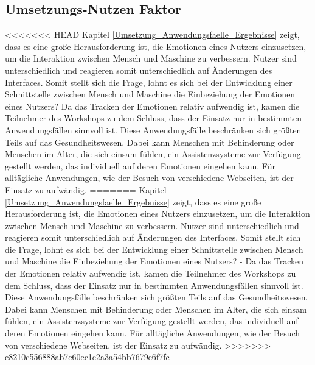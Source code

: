 \subsection{Umsetzungs-Nutzen Faktor}
<<<<<<< HEAD
Kapitel \ref{Umsetzung_Anwendungsfaelle_Ergebnisse} zeigt, dass es eine große Herausforderung ist, die Emotionen eines Nutzers einzusetzen, um die Interaktion zwischen Mensch und Maschine zu verbessern. Nutzer sind unterschiedlich und reagieren somit unterschiedlich auf Änderungen des Interfaces. Somit stellt sich die Frage, lohnt es sich bei der Entwicklung einer Schnittstelle zwischen Mensch und Maschine die Einbeziehung der Emotionen eines Nutzers? Da das Tracken der Emotionen relativ aufwendig ist, kamen die Teilnehmer des Workshops zu dem Schluss, dass der Einsatz nur in bestimmten Anwendungsfällen sinnvoll ist. Diese Anwendungsfälle beschränken sich größten Teils auf das Gesundheitswesen. Dabei kann Menschen mit Behinderung oder Menschen im Alter, die sich einsam fühlen, ein Assistenzsysteme zur Verfügung gestellt werden, das individuell auf deren Emotionen eingehen kann. Für alltägliche Anwendungen, wie der Besuch von verschiedene Webseiten, ist der Einsatz zu aufwändig.
=======
Kapitel \ref{Umsetzung_Anwendungsfaelle_Ergebnisse} zeigt, dass es eine große Herausforderung ist, die Emotionen eines Nutzers einzusetzen, um die Interaktion zwischen Mensch und Maschine zu verbessern. Nutzer sind unterschiedlich und reagieren somit unterschiedlich auf Änderungen des Interfaces. Somit stellt sich die Frage, lohnt es sich bei der Entwicklung einer Schnittstelle zwischen Mensch und Maschine die Einbeziehung der Emotionen eines Nutzers? -  Da das Tracken der Emotionen relativ aufwendig ist, kamen die Teilnehmer des Workshops zu dem Schluss, dass der Einsatz nur in bestimmten Anwendungsfällen sinnvoll ist. Diese Anwendungsfälle beschränken sich größten Teils auf das Gesundheitswesen. Dabei kann Menschen mit Behinderung oder Menschen im Alter, die sich einsam fühlen, ein Assistenzsysteme zur Verfügung gestellt werden, das individuell auf deren Emotionen eingehen kann. Für alltägliche Anwendungen, wie der Besuch von verschiedene Webseiten, ist der Einsatz zu aufwändig.
>>>>>>> c8210c556888ab7c60ec1c2a3a54bb7679e6f7fc

